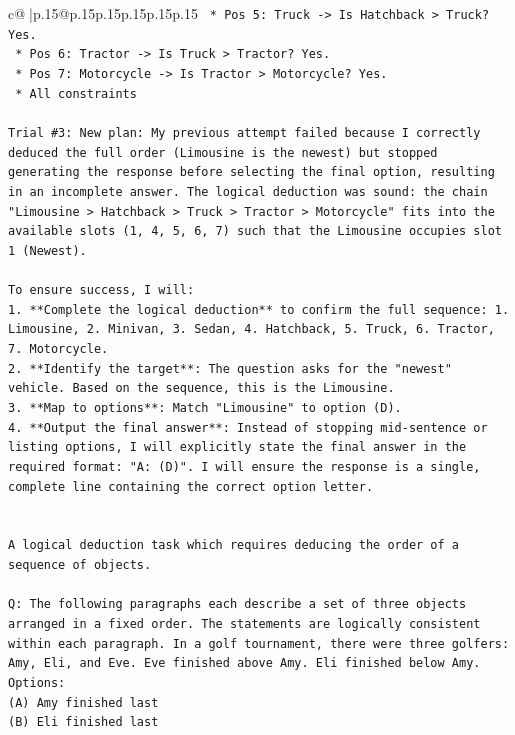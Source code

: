 \documentclass{article}
\begin{document}
{\begin{supertabular}{c@{$\;$}|p{.15\linewidth}@{}p{.15\linewidth}p{.15\linewidth}p{.15\linewidth}p{.15\linewidth}p{.15\linewidth}}
{{{\texttt{        *   Pos 5: Truck {-}> Is Hatchback > Truck? Yes.} \\
\texttt{        *   Pos 6: Tractor {-}> Is Truck > Tractor? Yes.} \\
\texttt{        *   Pos 7: Motorcycle {-}> Is Tractor > Motorcycle? Yes.} \\
\texttt{    *   All constraints} \\
\\ 
\texttt{Trial \#3: New plan: My previous attempt failed because I correctly deduced the full order (Limousine is the newest) but stopped generating the response before selecting the final option, resulting in an incomplete answer. The logical deduction was sound: the chain "Limousine > Hatchback > Truck > Tractor > Motorcycle" fits into the available slots (1, 4, 5, 6, 7) such that the Limousine occupies slot 1 (Newest).} \\
\\ 
\texttt{To ensure success, I will:} \\
\texttt{1.  **Complete the logical deduction** to confirm the full sequence: 1. Limousine, 2. Minivan, 3. Sedan, 4. Hatchback, 5. Truck, 6. Tractor, 7. Motorcycle.} \\
\texttt{2.  **Identify the target**: The question asks for the "newest" vehicle. Based on the sequence, this is the Limousine.} \\
\texttt{3.  **Map to options**: Match "Limousine" to option (D).} \\
\texttt{4.  **Output the final answer**: Instead of stopping mid{-}sentence or listing options, I will explicitly state the final answer in the required format: "A: (D)". I will ensure the response is a single, complete line containing the correct option letter.} \\
\\ 
\\ 
\texttt{A logical deduction task which requires deducing the order of a sequence of objects.} \\
\\ 
\texttt{Q: The following paragraphs each describe a set of three objects arranged in a fixed order. The statements are logically consistent within each paragraph. In a golf tournament, there were three golfers: Amy, Eli, and Eve. Eve finished above Amy. Eli finished below Amy.} \\
\texttt{Options:} \\
\texttt{(A) Amy finished last} \\
\texttt{(B) Eli finished last} \\
}}}
\end{supertabular}}
\end{document}
